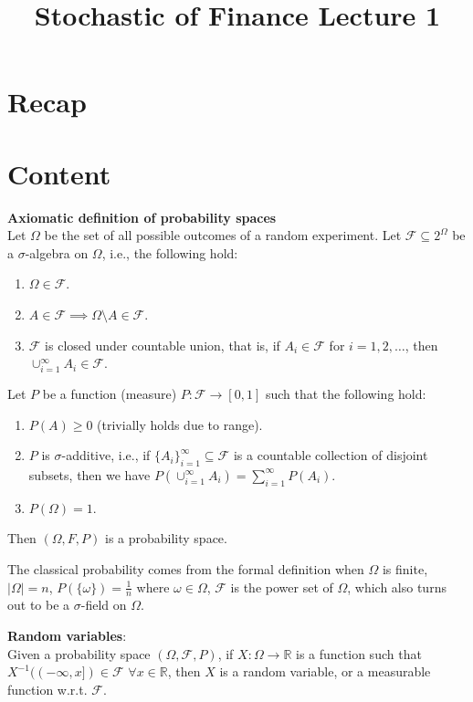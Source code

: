 \documentclass[a4paper]{article}
\title{\textbf{Stochastic of Finance Lecture 1}}
\date{}
\newcommand{\nl}{\vspace{0.2cm}\\}
\renewcommand{\sp}{\vspace{0.2cm}}
\newcommand{\F}{\mathcal{F}}
\newcommand{\R}{\mathbb{R}}
\begin{document}
\maketitle
\tableofcontents

\section{Recap}
\section{Content}

\begin{defn}
    \textbf{Axiomatic definition of probability spaces}\nl
    Let $\Omega$ be the set of all possible outcomes of a random experiment. Let $\F \subseteq 2^\Omega$ be a $\sigma$-algebra on $\Omega$, i.e., the following hold:

    \begin{enumerate}
        \item $\Omega \in \F$.
        \item $A \in \F \implies \Omega \setminus A \in \F$.
        \item $\F$ is closed under countable union, that is, if $A_i \in \F$ for $i = 1, 2, \ldots$, then $\cup_{i=1}^\infty A_i \in \F$.
    \end{enumerate}

    Let $P$ be a function (measure) $P : \F \to [0, 1]$ such that the following hold:

    \begin{enumerate}
        \item $P(A) \ge 0$ (trivially holds due to range).
        \item $P$ is $\sigma$-additive, i.e., if $\{A_i\}_{i=1}^\infty \subseteq \F$ is a countable collection of disjoint subsets, then we have $P(\cup_{i=1}^\infty A_i) = \sum_{i=1}^\infty P(A_i)$.
        \item $P(\Omega) = 1$.
    \end{enumerate}

    Then $(\Omega, F, P)$ is a probability space.
\end{defn}
\sp
The classical probability comes from the formal definition when $\Omega$ is finite, $|\Omega| = n$, $P(\{\omega\}) = \frac{1}{n}$ where $\omega \in \Omega$, $\F$ is the power set of $\Omega$,
which also turns out to be a $\sigma$-field on $\Omega$.\nl

\begin{defn}
    \textbf{Random variables}:\nl
    Given a probability space $(\Omega, \F, P)$, if $X : \Omega \to \R$ is a function such that $X^{-1}((-\infty, x]) \in \F$ $\forall x \in \R$, then $X$ is a random variable, or a
    measurable function w.r.t. $\F$.
\end{defn}
\end{document}

